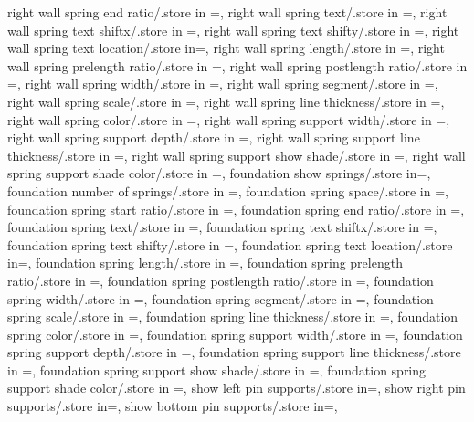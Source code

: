{  right wall spring end ratio/.store in =\rightwspringendratio,
  right wall spring text/.store in =\rightwspringtext,
  right wall spring text shiftx/.store in =\rightwtextshiftx,
  right wall spring text shifty/.store in =\rightwtextshifty,
  right wall spring text location/.store in=\rightwspringtextloc,
  right wall spring length/.store in =\rightwspringlength,
  right wall spring prelength ratio/.store in =\rightwprelenratio,
  right wall spring postlength ratio/.store in =\rightwpostlenratio,
  right wall spring width/.store in =\rightwampl,
  right wall spring segment/.store in =\rightwsegm,
  right wall spring scale/.store in =\rightwspringscale,
  right wall spring line thickness/.store in =\rightwspringthk,
  right wall spring color/.store in =\rightwspringcolor,
  right wall spring support width/.store in =\rightwsuppwidth,
  right wall spring support depth/.store in =\rightwsuppdepth,
  right wall spring support line thickness/.store in =\rightwsupplinethk,
  right wall spring support show shade/.store in =\rightwshowsuppshade,
  right wall spring support shade color/.store in =\rightwsuppshadecol,
  foundation show springs/.store in=\foundshowsprings,
  foundation number of springs/.store in =\foundspringnumber,
  foundation spring space/.store in =\foundspringspace,
  foundation spring start ratio/.store in =\foundspringstartratio,
  foundation spring end ratio/.store in =\foundspringendratio,
  foundation spring text/.store in =\foundspringtext,
  foundation spring text shiftx/.store in =\foundtextshiftx,
  foundation spring text shifty/.store in =\foundtextshifty,
  foundation spring text location/.store in=\foundspringtextloc,
  foundation spring length/.store in =\foundspringlength,
  foundation spring prelength ratio/.store in =\foundprelenratio,
  foundation spring postlength ratio/.store in =\foundpostlenratio,
  foundation spring width/.store in =\foundampl,
  foundation spring segment/.store in =\foundsegm,
  foundation spring scale/.store in =\foundspringscale,
  foundation spring line thickness/.store in =\foundspringthk,
  foundation spring color/.store in =\foundspringcolor,
  foundation spring support width/.store in =\foundsuppwidth,
  foundation spring support depth/.store in =\foundsuppdepth,
  foundation spring support line thickness/.store in =\foundsupplinethk,
  foundation spring support show shade/.store in =\foundshowsuppshade,
  foundation spring support shade color/.store in =\foundsuppshadecol,
  show left pin supports/.store in=\showleftpinsup,
  show right pin supports/.store in=\showrightpinsup,
  show bottom pin supports/.store in=\showbottompinsup,
}
